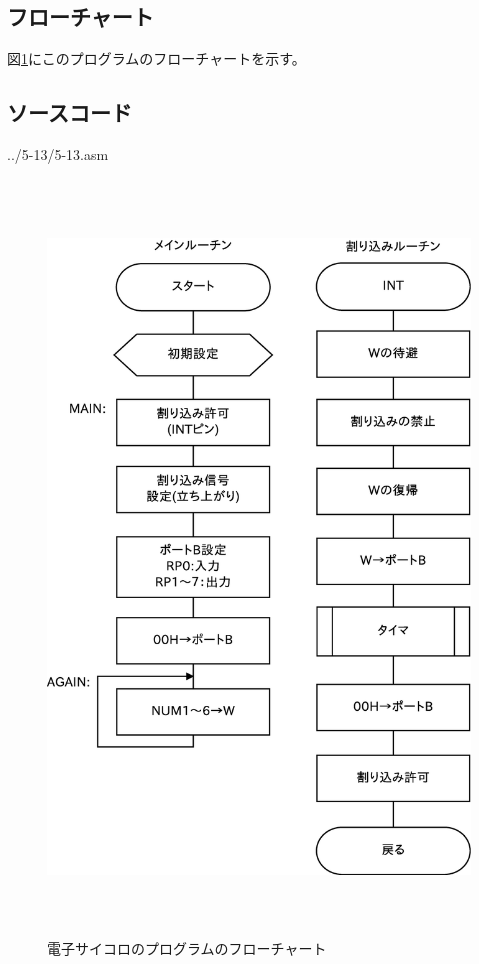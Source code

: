 \documentclass[a4paper,12pt]{ujarticle}
\begin{document}
  \subsection{フローチャート}
  図\ref{fig:flow_5-13}にこのプログラムのフローチャートを示す。
  \subsection{ソースコード}
  \begin{lstinputlisting}[basicstyle=\ttfamily\footnotesize, frame=single,numbers=left]
   {../5-13/5-13.asm}
  \end{lstinputlisting}
  \clearpage
   \begin{figure}[htbp]
   \begin{center}
    \includegraphics[height=200mm]{Diagram5-13.eps}
   \end{center}
   \caption{電子サイコロのプログラムのフローチャート}
   \label{fig:flow_5-13}
   \end{figure}
   \clearpage
\end{document}
